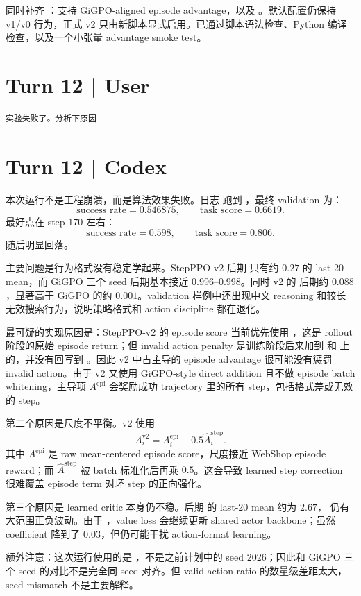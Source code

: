 \documentclass[10pt]{ctexart}
\begin{document}
同时补齐 ：支持 GiGPO-aligned  episode advantage，以及 。默认配置仍保持 v1/v0 行为，正式 v2 只由新脚本显式启用。已通过脚本语法检查、Python 编译检查，以及一个小张量 advantage smoke test。

\section*{Turn 12 | User}
\begin{Verbatim}[breaklines=true,breakanywhere=true]
实验失败了。分析下原因
\end{Verbatim}

\section*{Turn 12 | Codex}
本次运行不是工程崩溃，而是算法效果失败。日志  跑到 ，最终 validation 为：
\[
\mathrm{success\_rate}=0.546875,
\qquad
\mathrm{task\_score}=0.6619.
\]
最好点在 step 170 左右：
\[
\mathrm{success\_rate}=0.598,
\qquad
\mathrm{task\_score}=0.806.
\]
随后明显回落。

主要问题是行为格式没有稳定学起来。StepPPO-v2 后期  只有约 $0.27$ 的 last-20 mean，而 GiGPO 三个 seed 后期基本接近 $0.996$--$0.998$。同时 v2 的  后期约 $0.088$，显著高于 GiGPO 的约 $0.001$。validation 样例中还出现中文 reasoning 和较长无效搜索行为，说明策略格式和 action discipline 都在退化。

最可疑的实现原因是：StepPPO-v2 的 episode score 当前优先使用 ，这是 rollout 阶段的原始 episode return；但 invalid action penalty 是训练阶段后来加到  和  上的，并没有回写到 。因此 v2 中占主导的 episode advantage 很可能没有惩罚 invalid action。由于 v2 又使用 GiGPO-style direct addition 且不做 episode batch whitening，主导项 $A^{\mathrm{epi}}$ 会奖励成功 trajectory 里的所有 step，包括格式差或无效的 step。

第二个原因是尺度不平衡。v2 使用
\[
A_i^{\mathrm{v2}}=A_i^{\mathrm{epi}}+0.5\widehat A_i^{\mathrm{step}}.
\]
其中 $A^{\mathrm{epi}}$ 是 raw mean-centered episode score，尺度接近 WebShop episode reward；而 $\widehat A^{\mathrm{step}}$ 被 batch 标准化后再乘 $0.5$。这会导致 learned step correction 很难覆盖 episode term 对坏 step 的正向强化。

第三个原因是 learned critic 本身仍不稳。后期  的 last-20 mean 约为 $2.67$， 仍有大范围正负波动。由于 ，value loss 会继续更新 shared actor backbone；虽然 coefficient 降到了 $0.03$，但仍可能干扰 action-format learning。

额外注意：这次运行使用的是 ，不是之前计划中的 seed 2026；因此和 GiGPO 三个 seed 的对比不是完全同 seed 对齐。但 valid action ratio 的数量级差距太大，seed mismatch 不是主要解释。
\end{document}

